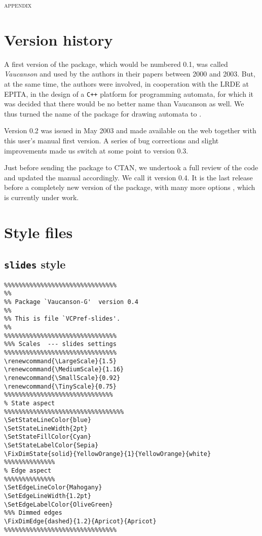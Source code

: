 \documentclass[11pt,twoside]{article}
\begin{document}
{\clearpage


\appendix


\begin{center}
    {\Large \textsc{appendix}}
\end{center}

\section{Version history}

A first version of the package, which would be numbered 0.1, was 
called \emph{Vaucanson} and used by the authors in their papers 
between 2000 and 2003.
But, at the same time, the authors were involved, in cooperation with
the LRDE at EPITA, in the design of a \texttt{C++} platform for 
programming automata, for which it was decided that there would be no 
better name than Vaucanson as well.
We thus turned the name of the package for drawing automata to \VCSG.

Version 0.2 was issued in May 2003 and made available on the web 
together with this user's manual first version.
A series of bug corrections and slight improvements made us switch at 
some point to version 0.3.

Just before sending the package to CTAN, we undertook a full review of 
the code and updated the manual accordingly. 
We call it version 0.4.
It is the last release before a completely new version of the 
package, with many more options , which is currently under work.


\clearpage 

\section{Style files}

\subsection{\texttt{slides} style}


{\footnotesize
\begin{verbatim}
%%%%%%%%%%%%%%%%%%%%%%%%%%%%%%%
%%
%% Package `Vaucanson-G'  version 0.4
%%
%% This is file `VCPref-slides'.
%%
%%%%%%%%%%%%%%%%%%%%%%%%%%%%%%%
%%% Scales  --- slides settings
%%%%%%%%%%%%%%%%%%%%%%%%%%%%%%%
\renewcommand{\LargeScale}{1.5}
\renewcommand{\MediumScale}{1.16}
\renewcommand{\SmallScale}{0.92}
\renewcommand{\TinyScale}{0.75}
%%%%%%%%%%%%%%%%%%%%%%%%%%%%%%
% State aspect
%%%%%%%%%%%%%%%%%%%%%%%%%%%%%%%%%
\SetStateLineColor{blue}
\SetStateLineWidth{2pt}
\SetStateFillColor{Cyan}
\SetStateLabelColor{Sepia}
\FixDimState{solid}{YellowOrange}{1}{YellowOrange}{white}
%%%%%%%%%%%%%%
% Edge aspect
%%%%%%%%%%%%%%
\SetEdgeLineColor{Mahogany}
\SetEdgeLineWidth{1.2pt}
\SetEdgeLabelColor{OliveGreen}
%%% Dimmed edges
\FixDimEdge{dashed}{1.2}{Apricot}{Apricot}
%%%%%%%%%%%%%%%%%%%%%%%%%%%%%%%
\end{verbatim}}
\newpage 

}
\end{document}
